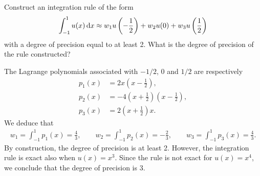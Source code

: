 \begin{exercise}
    Construct an integration rule of the form
    \[
        \int_{-1}^{1} u(x) \, \mathrm d x \approx w_1 u\left(-\frac{1}{2} \right) + w_2 u(0) +  w_3 u\left(\frac{1}{2} \right)
    \]
    with a degree of precision equal to at least 2.
    What is the degree of precision of the rule constructed?
\end{exercise}
\begin{solution}
    The Lagrange polynomials associated with $-1/2$, $0$ and $1/2$ are respectively
    \begin{align*}
        p_{1}(x) &= 2x \left(x - \frac{1}{2}\right), \\
        p_{2}(x)    &= - 4\left(x + \frac{1}{2}\right) \left(x - \frac{1}{2}\right), \\
        p_{3}(x)  &= 2\left(x + \frac{1}{2}\right) x.
    \end{align*}
    We deduce that
    \begin{align*}
        w_1 = \int_{-1}^1 p_{1}(x) = \frac{4}{3}, \qquad
        w_2 = \int_{-1}^1 p_{2}(x) = - \frac{2}{3}, \qquad
        w_3 = \int_{-1}^1 p_{3}(x) = \frac{4}{3}.
    \end{align*}
    By construction,
    the degree of precision is at least 2.
    However, the integration rule is exact also when $u(x) = x^3$.
    Since the rule is not exact for $u(x) = x^4$,
    we conclude that the degree of precision is 3.
\end{solution}

